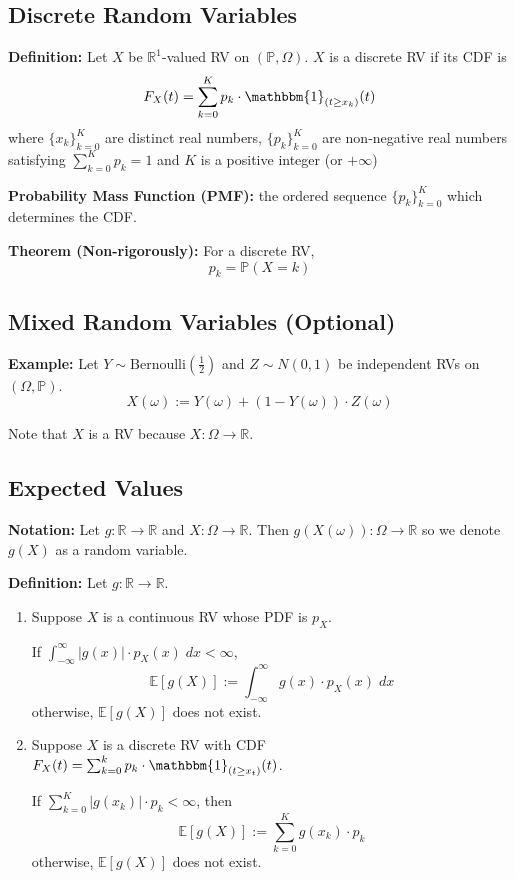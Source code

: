 \documentclass[12pt]{article}
\renewcommand{\P}{\mathbb{P}}
\newcommand{\R}{\mathbb{R}}
\newcommand{\E}{\mathbb{E}}
\newcommand{\ind}{\mathbbm{1}}
\begin{document}
\subsection*{Discrete Random Variables}
\textbf{Definition:} Let $X$ be $\R^1$-valued RV on $(\P, \Omega)$. $X$ is a discrete RV if its CDF is
\[F_X(t) = \sum_{k=0}^K p_k \cdot \ind_{(t \geq x_k)}(t)\]
where $\{x_k\}_{k=0}^K$ are distinct real numbers, $\{p_k\}_{k=0}^K$ are non-negative real numbers satisfying $\sum_{k=0}^K p_k = 1$ and $K$ is a positive integer (or $+\infty$)

\textbf{Probability Mass Function (PMF):} the ordered sequence $\{p_k\}_{k=0}^K$ which determines the CDF. 

\textbf{Theorem (Non-rigorously):} For a discrete RV, 
\[p_k = \P(X = k)\]

\subsection*{Mixed Random Variables (Optional)}
\textbf{Example:} Let $Y \sim \text{Bernoulli}(\frac{1}{2})$ and $Z\sim N(0,1)$ be independent RVs on $(\Omega, \P)$. 
\[X(\omega) := Y(\omega) + (1 - Y(\omega)) \cdot Z(\omega)\]

Note that $X$ is a RV because $X : \Omega \to \R$. 

\subsection*{Expected Values}
\textbf{Notation:} Let $g: \R \to \R$ and $X: \Omega \to \R$. Then $g(X(\omega)) : \Omega \to \R$ so we denote $g(X)$ as a random variable. 

\textbf{Definition:}
Let $g : \R \to \R$. 

\begin{enumerate}
    \item Suppose $X$ is a continuous RV whose PDF is $p_X$.
    
    If $\int_{-\infty}^{\infty} |g(x)| \cdot p_X(x)\; dx < \infty$, 
    \[\E[g(X)] := \int_{-\infty}^{\infty} g(x)\cdot p_X(x)\; dx\]
    otherwise, $\E[g(X)]$ does not exist.

    \item Suppose $X$ is a discrete RV with CDF $F_X(t) = \sum_{k=0}^k p_k \cdot \ind_{(t\geq x_t)}(t)$. 
    
    If $\sum_{k=0}^K |g(x_k)| \cdot p_k < \infty$, then 
    \[\E[g(X)] := \sum_{k=0}^K g(x_k) \cdot p_k\]
    otherwise, $\E[g(X)]$ does not exist.
\end{enumerate}
\end{document}

